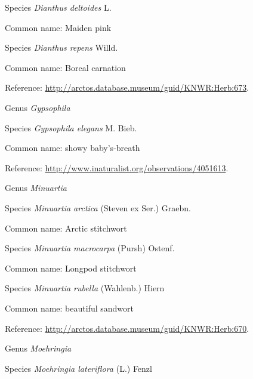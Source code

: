 \documentclass[9pt, article]{memoir}
\begin{document}
\begin{multicols}{2}
\vspace{6pt}\noindent\hspace{36pt}Species \textit{Dianthus deltoides} L.


Common name: Maiden pink

\vspace{6pt}\noindent\hspace{36pt}Species \textit{Dianthus repens} Willd.


Common name: Boreal carnation

Reference: 
\url{http://arctos.database.museum/guid/KNWR:Herb:673}.

\vspace{6pt}\noindent\hspace{30pt}Genus \textit{Gypsophila}


\vspace{6pt}\noindent\hspace{36pt}Species \textit{Gypsophila elegans} M. Bieb.


Common name: showy baby's-breath

Reference: 
\url{http://www.inaturalist.org/observations/4051613}.

\vspace{6pt}\noindent\hspace{30pt}Genus \textit{Minuartia}


\vspace{6pt}\noindent\hspace{36pt}Species \textit{Minuartia arctica} (Steven ex Ser.) Graebn.


Common name: Arctic stitchwort

\vspace{6pt}\noindent\hspace{36pt}Species \textit{Minuartia macrocarpa} (Pursh) Ostenf.


Common name: Longpod stitchwort

\vspace{6pt}\noindent\hspace{36pt}Species \textit{Minuartia rubella} (Wahlenb.) Hiern


Common name: beautiful sandwort

Reference: 
\url{http://arctos.database.museum/guid/KNWR:Herb:670}.

\vspace{6pt}\noindent\hspace{30pt}Genus \textit{Moehringia}


\vspace{6pt}\noindent\hspace{36pt}Species \textit{Moehringia lateriflora} (L.) Fenzl



\end{multicols}
\end{document}
